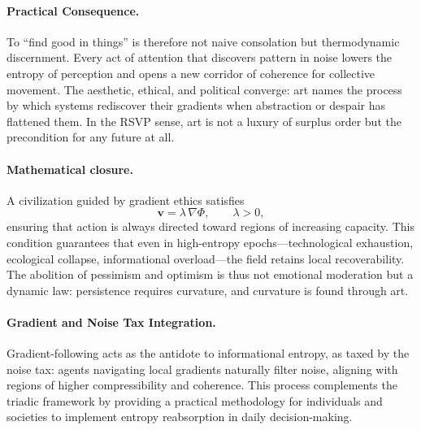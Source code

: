 \documentclass[12pt]{article}
\begin{document}
\paragraph{Practical Consequence.}
To ``find good in things'' is therefore not naive consolation but thermodynamic discernment.
Every act of attention that discovers pattern in noise lowers the entropy of perception and opens a new corridor of coherence for collective movement.
The aesthetic, ethical, and political converge: art names the process by which systems rediscover their gradients when abstraction or despair has flattened them.
In the RSVP sense, art is not a luxury of surplus order but the precondition for any future at all.

\paragraph{Mathematical closure.}
A civilization guided by gradient ethics satisfies
\[
\mathbf{v} = \lambda\,\nabla\Phi, \qquad \lambda>0,
\]
ensuring that action is always directed toward regions of increasing capacity.
This condition guarantees that even in high-entropy epochs---technological exhaustion, ecological collapse, informational overload---the field retains local recoverability.
The abolition of pessimism and optimism is thus not emotional moderation but a dynamic law:
persistence requires curvature, and curvature is found through art.

\paragraph{Gradient and Noise Tax Integration.}
Gradient-following acts as the antidote to informational entropy, as taxed by the noise tax: agents navigating local gradients naturally filter noise, aligning with regions of higher compressibility and coherence. This process complements the triadic framework by providing a practical methodology for individuals and societies to implement entropy reabsorption in daily decision-making.
\end{document}
